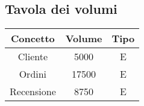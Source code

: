\subsection{Tavola dei volumi}
\begin{center}
\begin{tabular}{ |c|c|c|} 
\hline
Concetto & Volume & Tipo \\
\hline
\multirow{2}{6em}{Cliente} & \multirow{2}{2em}{5000} & \multirow{2}{12em}{E}\\
 & &\\
 \hline
\multirow{2}{6em}{Ordini} & \multirow{2}{2em}{17500} & \multirow{2}{12em}{E}\\
 & &\\
\hline

\multirow{2}{6em}{Recensione} & \multirow{2}{2em}{8750} & \multirow{2}{12em}{E}\\
 & &\\
\hline


\end{tabular}
\end{center}
